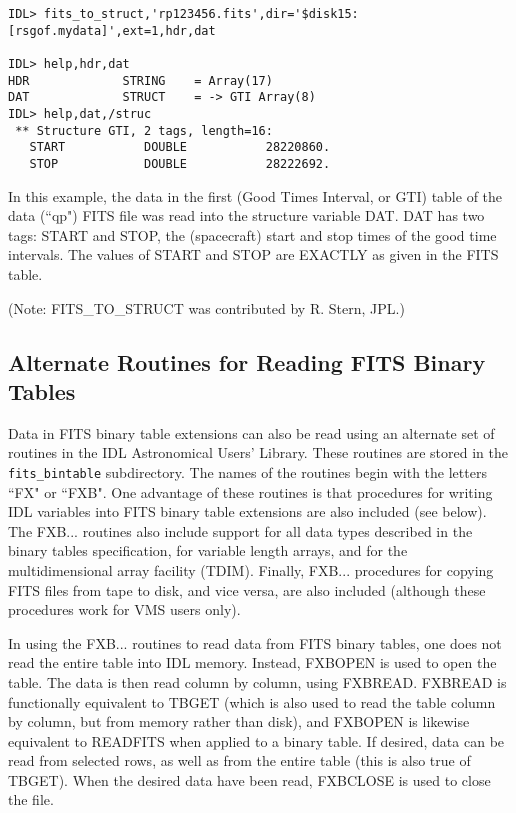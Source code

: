 \medskip\noindent
\begin{verbatim}
IDL> fits_to_struct,'rp123456.fits',dir='$disk15:[rsgof.mydata]',ext=1,hdr,dat
 
IDL> help,hdr,dat
HDR             STRING    = Array(17)
DAT             STRUCT    = -> GTI Array(8)
IDL> help,dat,/struc
 ** Structure GTI, 2 tags, length=16:
   START           DOUBLE           28220860.
   STOP            DOUBLE           28222692.
\end{verbatim}
In this example, the data in the first (Good Times Interval, or GTI) table of
the data (``qp") FITS file was read into the structure variable DAT. DAT has two
tags: START and STOP, the (spacecraft) start and stop times of the good time
intervals. The values of START and STOP are EXACTLY as given in the FITS table.
 
(Note: FITS{\_}TO{\_}STRUCT was contributed by R. Stern, JPL.)
 

\subsection{Alternate Routines for Reading FITS Binary Tables}
 
Data in FITS binary table extensions can also be read using an alternate
set of routines in the IDL Astronomical Users' Library. These routines are
stored in the {\tt fits{\_}bintable} subdirectory. The names of the routines begin
with the letters ``FX" or ``FXB". One advantage of these routines is that
procedures for writing IDL variables into FITS binary table extensions are
also included (see below). The FXB... routines also include support for all
data types described in the binary tables specification, for variable
length arrays, and for the multidimensional array facility (TDIM). Finally,
FXB... procedures for copying FITS files from tape to disk, and vice versa,
are also included (although these procedures work for VMS users only).
 
In using the FXB... routines to read data from FITS binary tables, one does
not read the entire table into IDL memory. Instead, FXBOPEN is used to open
the table. The data is then read column by column, using FXBREAD. FXBREAD
is functionally equivalent to TBGET (which is also used to read the table
column by column, but from memory rather than disk), and FXBOPEN is
likewise equivalent to READFITS when applied to a binary table. If desired,
data can be read from selected rows, as well as from the entire table (this
is also true of TBGET). When the desired data have been read, FXBCLOSE is
used to close the file.
 
